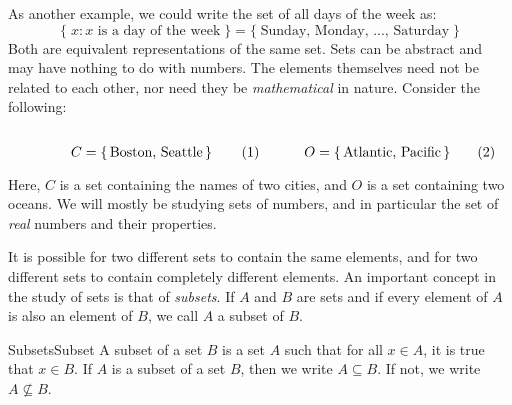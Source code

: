         \begin{lexample}{}{}
            As another example, we could write
            the set of all days of the week as:
            \begin{equation}
                \{\;x:x\textrm{ is a day of the week}\;\}
                =\{\;\textrm{Sunday, Monday, ..., Saturday}\;\}
            \end{equation}
            Both are equivalent representations of the same set. Sets
            can be abstract and may have nothing to do with numbers.
            The elements themselves need not be related to each other,
            nor need they be \textit{mathematical} in nature. Consider
            the following:
            \begin{subequations}
                \begin{minipage}{0.49\textwidth}
                    \centering
                    \begin{equation}
                        C=\{\,\textrm{Boston, Seattle}\,\}
                    \end{equation}
                \end{minipage}
                \hfill
                \begin{minipage}{0.49\textwidth}
                    \centering
                    \begin{equation}
                        O=\{\,\textrm{Atlantic, Pacific}\,\}
                    \end{equation}
                \end{minipage}
            \end{subequations}
            \par\vspace{2.5ex}
            Here, $C$ is a set containing the names of two
            cities, and $O$ is a set containing two oceans.
            We will mostly be studying sets of numbers, and
            in particular the set of \textit{real} numbers
            and their properties.
        \end{lexample}
            It is possible for two different
            sets to contain the
            same elements, and for two different
            sets to contain
            completely different elements.
            An important concept in the study of
            sets is that of \textit{subsets}. If
            $A$ and $B$ are sets and if every
            element of $A$ is also an element of $B$,
            we call $A$ a subset of $B$.
            \begin{fdefinition}{Subsets}{Subset}
                A subset of a set $B$ is a set $A$
                such that for all $x\in{A}$,
                it is true that $x\in{B}$. If $A$ is a
                subset of a set $B$, then we write
                $A\subseteq{B}$. If not, we write
                $A\not\subseteq{B}$.
            \end{fdefinition}
